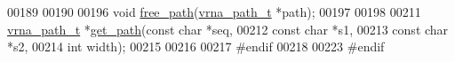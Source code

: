 \begin{DoxyCode}
00189 
00190 
00196 \textcolor{keywordtype}{void}    \hyperlink{group__direct__paths_ga9056421d716ae89f0ed3f107627f395b}{free\_path}(\hyperlink{group__direct__paths_structvrna__path__s}{vrna\_path\_t} *path);
00197 
00198 
00211 \hyperlink{group__direct__paths_structvrna__path__s}{vrna\_path\_t} *\hyperlink{group__direct__paths_gac009a44db824f90a6de5f9c28b9b3222}{get\_path}(\textcolor{keyword}{const} \textcolor{keywordtype}{char}  *seq,
00212                       \textcolor{keyword}{const} \textcolor{keywordtype}{char}  *s1,
00213                       \textcolor{keyword}{const} \textcolor{keywordtype}{char}  *s2,
00214                       \textcolor{keywordtype}{int}         width);
00215 
00216 
00217 \textcolor{preprocessor}{#endif}
00218 
00223 \textcolor{preprocessor}{#endif}
\end{DoxyCode}
